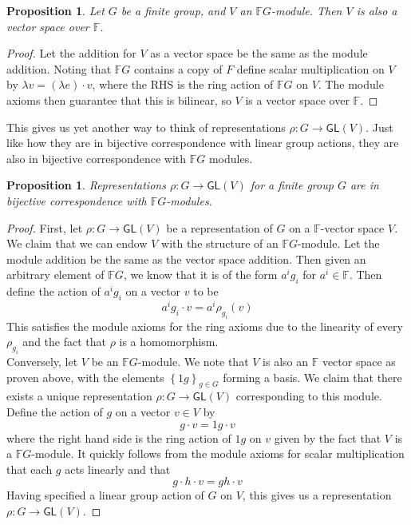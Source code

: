 \documentclass[psamsfonts]{amsart}
\newtheorem{prop}[thm]{Proposition}
\theoremstyle{definition}
\theoremstyle{remark}
\newcommand{\F}{\mathbb{F}}
\newcommand{\GL}{\mathsf{GL}}
\newcommand{\set}[1]{\left\lbrace#1 \right\rbrace}
\begin{document}
\begin{prop}
Let $G$ be a finite group, and $V$ an $\F G$-module. Then $V$ is also a vector space over $\F$.
\end{prop}

\begin{proof}
Let the addition for $V$ as a vector space be the same as the module addition. Noting that $\F G$ contains a copy of $F$ define scalar multiplication on $V$ by $\lambda v = (\lambda e)\cdot v$, where the RHS is the ring action of $\F G$ on $V$. The module axioms then guarantee that this is bilinear, so $V$ is a vector space over $\F$.
\end{proof}

This gives us yet another way to think of representations $\rho: G \to \GL(V)$. Just like how they are in bijective correspondence with linear group actions, they are also in bijective correspondence with $\F G$ modules.

\begin{prop}
Representations $\rho: G \to \GL(V)$ for a finite group $G$ are in bijective correspondence with $\F G$-modules.
\end{prop}

\begin{proof}
First, let $\rho: G \to \GL(V)$ be a representation of $G$ on a $\F$-vector space $V$. We claim that we can endow $V$ with the structure of an $\F G$-module. Let the module addition be the same as the vector space addition. Then given an arbitrary element of $\F G$, we know that it is of the form $a^ig_i$ for $a^i \in \F$. Then define the action of $a^ig_i$ on a vector $v$ to be 
$$a^ig_i \cdot v = a^i \rho_{g_i}(v) $$
This satisfies the module axioms for the ring axioms due to the linearity of every $\rho_{g_i}$ and the fact that $\rho$ is a homomorphism.\\

Conversely, let $V$ be an $\F G$-module. We note that $V$ is also an $\F$ vector space as proven above, with the elements $\set{1g}_{g \in G}$ forming a basis. We claim that there exists a unique representation $\rho: G \to \GL(V)$ corresponding to this module. Define the action of $g$ on a vector $v \in V$ by
$$g \cdot v = 1g \cdot v $$
where the right hand side is the ring action of $1g$ on $v$ given by the fact that $V$ is a $\F G$-module. It quickly follows from the module axioms for scalar multiplication that each $g$ acts linearly and that 
$$g \cdot h \cdot v = gh \cdot v $$
Having specified a linear group action of $G$ on $V$, this gives us a representation $\rho: G \to \GL(V)$.
\end{proof}
\end{document}
